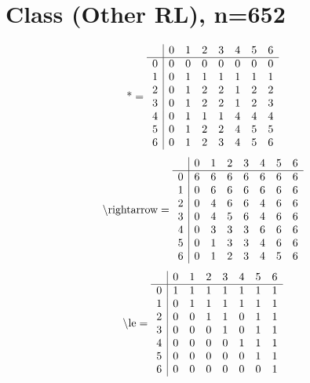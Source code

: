 \documentclass[11pt]{article}
\begin{document}
\section{Class (Other RL), n=652}
\[\text{*} = 
\begin{array}{r | r r r r r r r}
 & 0 & 1 & 2 & 3 & 4 & 5 & 6 \\ \hline
0 & 0 & 0 & 0 & 0 & 0 & 0 & 0 \\
1 & 0 & 1 & 1 & 1 & 1 & 1 & 1 \\
2 & 0 & 1 & 2 & 2 & 1 & 2 & 2 \\
3 & 0 & 1 & 2 & 2 & 1 & 2 & 3 \\
4 & 0 & 1 & 1 & 1 & 4 & 4 & 4 \\
5 & 0 & 1 & 2 & 2 & 4 & 5 & 5 \\
6 & 0 & 1 & 2 & 3 & 4 & 5 & 6 \\
\end{array}
\]
\[\text{\textbackslash rightarrow} = 
\begin{array}{r | r r r r r r r}
 & 0 & 1 & 2 & 3 & 4 & 5 & 6 \\ \hline
0 & 6 & 6 & 6 & 6 & 6 & 6 & 6 \\
1 & 0 & 6 & 6 & 6 & 6 & 6 & 6 \\
2 & 0 & 4 & 6 & 6 & 4 & 6 & 6 \\
3 & 0 & 4 & 5 & 6 & 4 & 6 & 6 \\
4 & 0 & 3 & 3 & 3 & 6 & 6 & 6 \\
5 & 0 & 1 & 3 & 3 & 4 & 6 & 6 \\
6 & 0 & 1 & 2 & 3 & 4 & 5 & 6 \\
\end{array}
\]
\[\text{\textbackslash le} = 
\begin{array}{r | r r r r r r r}
 & 0 & 1 & 2 & 3 & 4 & 5 & 6 \\ \hline
0 & 1 & 1 & 1 & 1 & 1 & 1 & 1 \\
1 & 0 & 1 & 1 & 1 & 1 & 1 & 1 \\
2 & 0 & 0 & 1 & 1 & 0 & 1 & 1 \\
3 & 0 & 0 & 0 & 1 & 0 & 1 & 1 \\
4 & 0 & 0 & 0 & 0 & 1 & 1 & 1 \\
5 & 0 & 0 & 0 & 0 & 0 & 1 & 1 \\
6 & 0 & 0 & 0 & 0 & 0 & 0 & 1 \\
\end{array}
\]
\end{document}
